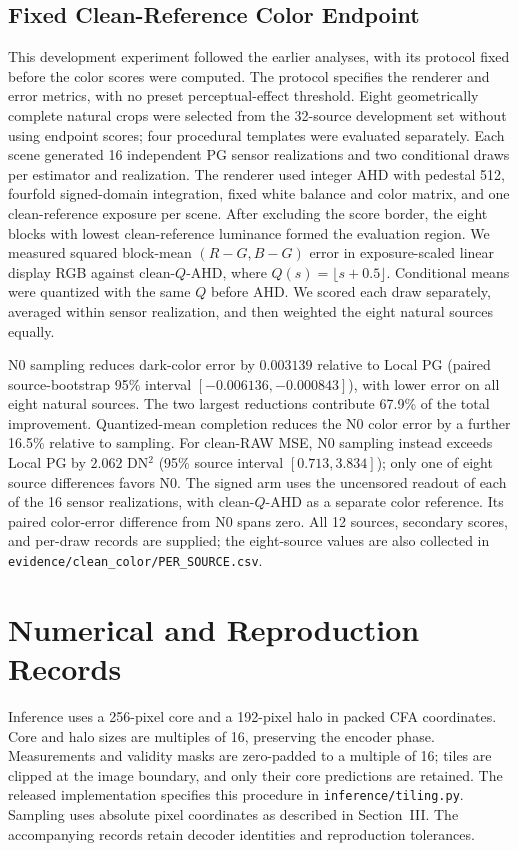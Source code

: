 \documentclass[10pt,twocolumn,journal]{IEEEtran}
\begin{document}
\subsection{Fixed Clean-Reference Color Endpoint}\label{sec:cleanendpoint}
This development experiment followed the earlier analyses, with its protocol fixed before the color scores were computed. The protocol specifies the renderer and error metrics, with no preset perceptual-effect threshold. Eight geometrically complete natural crops were selected from the 32-source development set without using endpoint scores; four procedural templates were evaluated separately. Each scene generated 16 independent PG sensor realizations and two conditional draws per estimator and realization. The renderer used integer AHD with pedestal 512, fourfold signed-domain integration, fixed white balance and color matrix, and one clean-reference exposure per scene. After excluding the score border, the eight blocks with lowest clean-reference luminance formed the evaluation region. We measured squared block-mean $(R-G,B-G)$ error in exposure-scaled linear display RGB against clean-$Q$-AHD, where $Q(s)=\lfloor s+0.5\rfloor$. Conditional means were quantized with the same $Q$ before AHD. We scored each draw separately, averaged within sensor realization, and then weighted the eight natural sources equally.



N0 sampling reduces dark-color error by $0.003139$ relative to Local PG (paired source-bootstrap 95\% interval $[-0.006136,-0.000843]$), with lower error on all eight natural sources. The two largest reductions contribute 67.9\% of the total improvement. Quantized-mean completion reduces the N0 color error by a further 16.5\% relative to sampling. For clean-RAW MSE, N0 sampling instead exceeds Local PG by $2.062$ DN$^2$ (95\% source interval $[0.713,3.834]$); only one of eight source differences favors N0. The signed arm uses the uncensored readout of each of the 16 sensor realizations, with clean-$Q$-AHD as a separate color reference. Its paired color-error difference from N0 spans zero. All 12 sources, secondary scores, and per-draw records are supplied; the eight-source values are also collected in \texttt{evidence/clean\_color/}\allowbreak\texttt{PER\_SOURCE.csv}.

\section{Numerical and Reproduction Records}
Inference uses a 256-pixel core and a 192-pixel halo in packed CFA coordinates. Core and halo sizes are multiples of 16, preserving the encoder phase. Measurements and validity masks are zero-padded to a multiple of 16; tiles are clipped at the image boundary, and only their core predictions are retained. The released implementation specifies this procedure in \texttt{inference/tiling.py}. Sampling uses absolute pixel coordinates as described in Section~III. The accompanying records retain decoder identities and reproduction tolerances.
\end{document}
